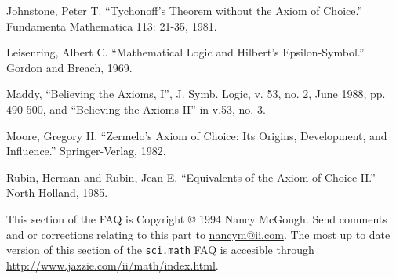 Johnstone, Peter T.  ``Tychonoff's Theorem without the Axiom of
Choice.''  Fundamenta Mathematica 113: 21-35, 1981.

Leisenring, Albert C.  ``Mathematical Logic and Hilbert's
Epsilon-Symbol.''  Gordon and Breach, 1969.

Maddy, ``Believing the Axioms, I'', J. Symb. Logic, v. 53, no. 2, June
1988, pp. 490-500, and ``Believing the Axioms II'' in v.53, no. 3.

Moore, Gregory H.  ``Zermelo's Axiom of Choice: Its Origins,
Development, and Influence.''  Springer-Verlag, 1982.

Rubin, Herman and Rubin, Jean E.  ``Equivalents of the Axiom of Choice
II.''  North-Holland, 1985.

This section of the FAQ is Copyright © 1994 Nancy McGough.  Send
comments and or corrections relating to this part to
\url{nancym@ii.com}.  The most up to date version of this section of the
\href{news://sci.math}{\texttt{sci.math}} FAQ is accesible through
\url{http://www.jazzie.com/ii/math/index.html}.
